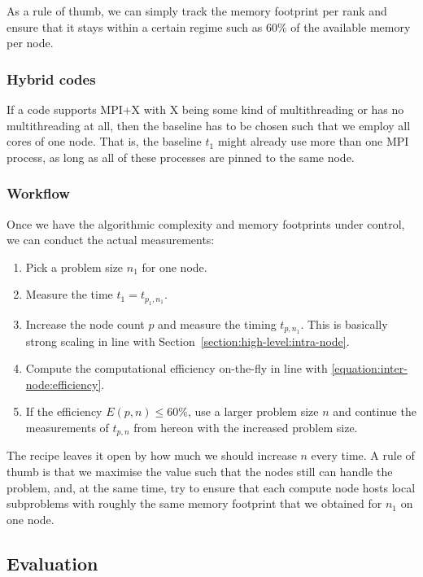 \noindent
As a rule of thumb, we can simply track the memory footprint per rank and ensure that it stays within a certain regime such as 60\% of the available memory per node. 

\subsubsection{Hybrid codes}

If a code supports MPI+X with X being some kind of multithreading or has no multithreading at all, then the baseline has to be chosen such that we employ all cores of one node.
That is, the baseline $t_{1}$ might already use more than one MPI process, as long as all of these processes are pinned to the same node.

\subsubsection{Workflow}

Once we have the algorithmic complexity and memory footprints under control, we can conduct the actual measurements:

\begin{enumerate}
  \item Pick a problem size $n_1$ for one node.
  \item Measure the time $t_1 = t_{p_1,n_1}$.
  \item Increase the node count $p$ and measure the timing $t_{p,n_1}$. This is basically strong scaling in line with Section~\ref{section:high-level:intra-node}.
  \item Compute the computational efficiency on-the-fly in line with \eqref{equation:inter-node:efficiency}.
  \item If the efficiency $E(p, n)\leq 60\%$, use a larger problem size $n$ and continue the measurements of $t_{p,n}$ from hereon with the increased problem size.
\end{enumerate}

\noindent
The recipe leaves it open by how much we should increase $n$ every time.
A rule of thumb is that we maximise the value such that the nodes still can handle the problem, and, at the same time, try to ensure that each compute node hosts local subproblems with roughly the same memory footprint that we obtained for $n_1$ on one node.



\subsection{Evaluation}

